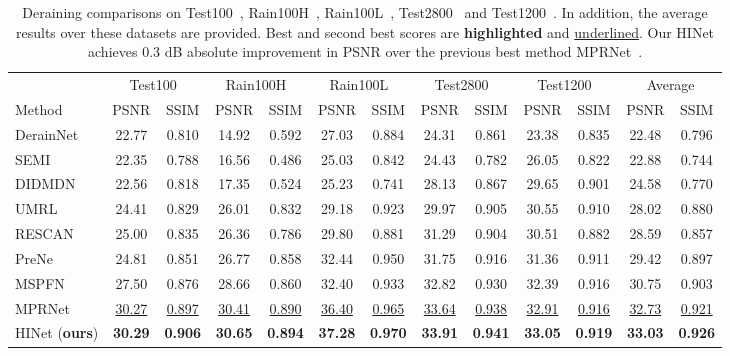 \documentclass[final]{cvpr}
\newcommand{\tablestyle}[2]{\setlength{\tabcolsep}{#1}\renewcommand{\arraystretch}{#2}\centering\footnotesize}
\begin{document}
\begin{table*}
\centering
\tablestyle{5pt}{1.05}\setlength{\tabcolsep}{1.mm}\begin{tabular}{l|cccccccccc|cc}
& \multicolumn{2}{c}{Test100~\cite{zhang2019image}}& \multicolumn{2}{c}{Rain100H~\cite{yang2017deep}}& \multicolumn{2}{c}{Rain100L~\cite{yang2017deep}}& \multicolumn{2}{c}{Test2800~\cite{fu2017removing}}& \multicolumn{2}{c}{Test1200~\cite{zhang2018density}}& \multicolumn{2}{|c}{Average}\\
Method&PSNR & SSIM&PSNR &SSIM &PSNR & SSIM & PSNR & SSIM & PSNR & SSIM & PSNR & SSIM\\
\hline
DerainNet~\cite{fu2017clearing}&22.77 & 0.810 & 14.92 & 0.592 & 27.03 & 0.884 & 24.31 & 0.861 & 23.38 & 0.835 & 22.48 & 0.796\\
SEMI~\cite{wei2019semi} & 22.35 & 0.788 & 16.56 & 0.486 & 25.03 & 0.842 & 24.43 & 0.782 & 26.05 & 0.822 & 22.88 & 0.744\\
DIDMDN~\cite{zhang2018density} & 22.56 & 0.818 & 17.35 & 0.524 & 25.23 & 0.741 & 28.13 & 0.867 & 29.65 & 0.901 & 24.58 & 0.770\\
UMRL~\cite{yasarla2019uncertainty} & 24.41 & 0.829 & 26.01 & 0.832 & 29.18 & 0.923 & 29.97 & 0.905 & 30.55 & 0.910 & 28.02 & 0.880\\
RESCAN~\cite{li2018recurrent}& 25.00 & 0.835 & 26.36 & 0.786 & 29.80 & 0.881 & 31.29 & 0.904 & 30.51 & 0.882 & 28.59 & 0.857\\
PreNe~\cite{ren2019progressive} & 24.81 & 0.851 & 26.77 & 0.858 & 32.44 & 0.950 & 31.75 & 0.916 & 31.36 & 0.911 & 29.42 & 0.897\\
MSPFN~\cite{jiang2020multi} & 27.50 & 0.876 & 28.66 & 0.860 & 32.40 & 0.933 & 32.82 & 0.930 & 32.39 & 0.916 & 30.75 & 0.903\\
MPRNet~\cite{Zamir2021MPRNet} & \underline{30.27} & \underline{0.897} & \underline{30.41} & \underline{0.890} & \underline{36.40} & \underline{0.965} & \underline{33.64} & \underline{0.938} & \underline{32.91} & \underline{0.916} & \underline{32.73} & \underline{0.921}\\
\hline
HINet (\textbf{ours})& \textbf{30.29}& \textbf{0.906} & \textbf{30.65} & \textbf{0.894} & \textbf{37.28} & \textbf{0.970} & \textbf{33.91} & \textbf{0.941} & \textbf{33.05} & \textbf{0.919} & \textbf{33.03} & \textbf{0.926}\\
\end{tabular}
\vspace{-.2cm}
\caption{Deraining comparisons on Test100~\cite{zhang2019image}, Rain100H~\cite{yang2017deep}, Rain100L~\cite{yang2017deep}, Test2800~\cite{fu2017removing} and Test1200~\cite{zhang2018density}. In addition, the average results over these datasets are provided. Best and second best scores are \textbf{highlighted} and \underline{underlined}. Our HINet achieves 0.3 dB absolute improvement in PSNR over the previous best method MPRNet~\cite{Zamir2021MPRNet}.}
\label{tab.Rain13k.results}
\vspace{-0.3cm}
\end{table*}
\end{document}
